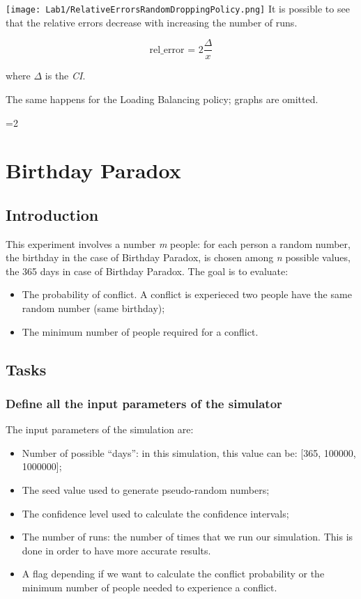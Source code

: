 \documentclass{report}
\newcounter{debug}
\begin{document}
{			\texttt{[image: Lab1/RelativeErrorsRandomDroppingPolicy.png]}
			It is possible to see that the relative errors decrease with increasing the number of runs. 
			
			\begin{equation}
				 \text{rel\_error = }2\frac{\Delta}{x}
			\end{equation}
			\begin{center}
					where $\Delta$ is the \emph{CI}.
			\end{center}
			The same happens for the Loading Balancing policy; graphs are omitted.
			
} \fi		
			
			
\ifnum\value{debug}=2 {

\chapter{Birthday Paradox}
	 
	 \section{Introduction}
	 
	This experiment involves a number \emph{m} people: for each person a random number, the birthday in the case of Birthday Paradox, is chosen among \emph{n} possible values, the 365 days in case of Birthday Paradox. The goal is to evaluate:
	\begin{itemize}
		\item The probability of conflict. A conflict is experieced two people have the same random number (same birthday);
		\item The minimum number of people required for a conflict.
	\end{itemize}

	\section{Tasks}
	 
		\subsection{Define all the input parameters of the simulator}
			The input parameters of the simulation are:
			\begin{itemize}
				\item Number of possible ``days'': in this simulation, this value can be: [365, 100000, 1000000];
				\item The seed value used to generate pseudo-random numbers;
				\item The confidence level used to calculate the confidence intervals;
				\item The number of runs: the number of times that we run our simulation. This is done in order to have more accurate results.
				\item A flag depending if we want to calculate the conflict probability or the minimum number of people needed to experience a conflict.
			\end{itemize}
			 
}
\end{document}
